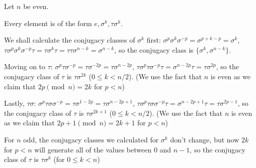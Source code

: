 \begin{cExercise}
	Let $n$ be even.
	
	Every element is of the form $e,\sigma^k,\tau\sigma^k$.
	
	We shall calculate the conjugacy classes of $\sigma^k$ first: $\sigma^p\sigma^k\sigma^{-p}=\sigma^{p+k-p}=\sigma^k$, $\tau\sigma^p\sigma^k\sigma^{-p}\tau=\tau\sigma^k\tau=\tau\tau\sigma^{n-k}=\sigma^{n-k}$, so the conjugacy class is $\{\sigma^k,\sigma^{n-k}\}$.
	
	Moving on to $\tau$: $\sigma^p\tau\sigma^{-p}=\tau\sigma^{-2p}=\tau\sigma^{n-2p}$, $\tau\sigma^p\tau\sigma^{-p}\tau=\sigma^{n-2p}\tau=\tau\sigma^{2p}$, so the conjugacy class of $\tau$ is $\tau\sigma^{2k}$ ($0\le k<n/2$). (We use the fact that $n$ is even as we claim that $2p\pmod n=2k$ for $p<n$)
	
	Lastly, $\tau\sigma$:
	$\sigma^p\tau\sigma\sigma^{-p}=\tau\sigma^{1-2p}=\tau\sigma^{n-2p+1}$, $\tau\sigma^p\tau\sigma\sigma^{-p}\tau=\sigma^{n-2p+1}\tau=\tau\sigma^{2p-1}$, so the conjugacy class of $\tau$ is $\tau\sigma^{2k+1}$ ($0\le k<n/2$). (We use the fact that $n$ is even as we claim that $2p + 1\pmod n=2k + 1$ for $p<n$)
	
	For $n$ odd, the conjugacy classes we calculated for $\sigma^k$ don't change, but now $2k$ for $p<n$ will generate all of the values between $0$ and $n-1$, so the conjugacy class of $\tau$ is $\tau\sigma^k$ (for $0\le k<n$)
\end{cExercise}
